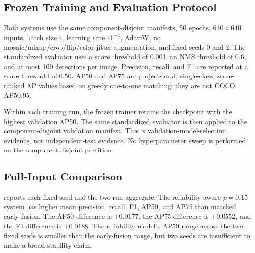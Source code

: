 \subsection{Frozen Training and Evaluation Protocol}
Both systems use the same component-disjoint manifests, 50 epochs, $640\times640$ inputs, batch size 4, learning rate $10^{-4}$, AdamW, no mosaic/mixup/crop/flip/color-jitter augmentation, and fixed seeds 0 and 2. The standardized evaluator uses a score threshold of 0.001, an NMS threshold of 0.6, and at most 100 detections per image. Precision, recall, and F1 are reported at a score threshold of 0.50. AP50 and AP75 are project-local, single-class, score-ranked AP values based on greedy one-to-one matching; they are not COCO AP50:95.

Within each training run, the frozen trainer retains the checkpoint with the highest validation AP50. The same standardized evaluator is then applied to the component-disjoint validation manifest. This is validation-model-selection evidence, not independent-test evidence. No hyperparameter sweep is performed on the component-disjoint partition.

\subsection{Full-Input Comparison}
 reports each fixed seed and the two-run aggregate. The reliability-aware $p=0.15$ system has higher mean precision, recall, F1, AP50, and AP75 than matched early fusion. The AP50 difference is $+0.0177$, the AP75 difference is $+0.0552$, and the F1 difference is $+0.0188$. The reliability model's AP50 range across the two fixed seeds is smaller than the early-fusion range, but two seeds are insufficient to make a broad stability claim.

